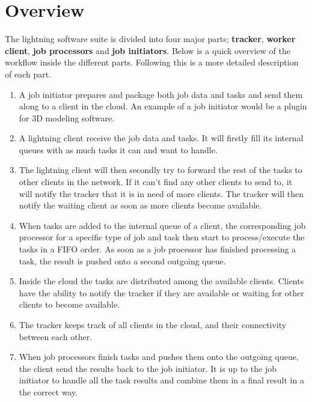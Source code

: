 \chapter{Overview}
The lightning software suite is divided into four major parts; \textbf{tracker}, \textbf{worker client}, \textbf{job processors} and \textbf{job initiators}. Below is a quick overview of the workflow inside the different parts. Following this is a more detailed description of each part.

\begin{enumerate}
  \item A job initiator prepares and package both job data and tasks and send them along to a client in the cloud. An example of a job initiator would be a plugin for 3D modeling software.
  \item A lightning client receive the job data and tasks. It will firstly fill its internal queues with as much tasks it can and want to handle.
  \item The lightning client will then secondly try to forward the rest of the tasks to other clients in the network. If it can't find any other clients to send to, it will notify the tracker that it is in need of more clients. The tracker will then notify the waiting client as soon as more clients become available.
  \item When tasks are added to the internal queue of a client, the corresponding job processor for a specific type of job and task then start to process/execute the tasks in a FIFO order. As soon as a job processor has finished processing a task, the result is pushed onto a second outgoing queue.
  \item Inside the cloud the tasks are distributed among the available clients. Clients have the ability to notify the tracker if they are available or waiting for other clients to become available.
  \item The tracker keeps track of all clients in the cloud, and their connectivity between each other.
  \item When job processors finish tasks and pushes them onto the outgoing queue, the client send the results back to the job initiator. It is up to the job initiator to handle all the task results and combine them in a final result in a the correct way.
\end{enumerate}

